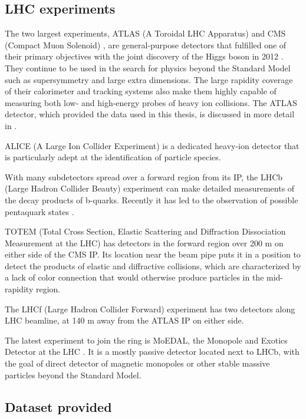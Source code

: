 \subsection{LHC experiments}
The two largest \lhc experiments, ATLAS (A Toroidal LHC Apparatus) \cite{Aad:2008zzm} and CMS (Compact Muon Solenoid) \cite{Chatrchyan:2008aa}, are general-purpose detectors that fulfilled one of their primary objectives with the joint discovery of the Higgs boson in 2012 \cite{Aad:2012tfa,Chatrchyan:2012xdj}.
They continue to be used in the search for physics beyond the Standard Model such as supersymmetry and large extra dimensions.
The large rapidity coverage of their calorimeter and tracking systems also make them highly capable of measuring both low- and high-energy probes of heavy ion collisions.
The ATLAS detector, which provided the data used in this thesis, is discussed in more detail in .

ALICE (A Large Ion Collider Experiment) \cite{Aamodt:2008zz} is a dedicated heavy-ion detector that is particularly adept at the identification of particle species.

With many subdetectors spread over a forward region from its IP, the LHCb (Large Hadron Collider Beauty) experiment \cite{Alves:2008zz} can make detailed measurements of the decay products of b-quarks. Recently it has led to the observation of possible pentaquark states \cite{Aaij:2015tga}.

TOTEM (Total Cross Section, Elastic Scattering and Diffraction Dissociation Measurement at the LHC) \cite{Anelli:2008zza} has detectors in the forward region over 200 m on either side of the CMS IP.
Its location near the beam pipe puts it in a position to detect the products of elastic and diffractive collisions, which are characterized by a lack of color connection that would otherwise produce particles in the mid-rapidity region.

The LHCf (Large Hadron Collider Forward) experiment \cite{Adriani:2008zz} has two detectors along LHC beamline, at 140 m away from the ATLAS IP on either side.

The latest experiment to join the ring is MoEDAL, the Monopole and Exotics Detector at the LHC \cite{Acharya:2014nyr}.
It is a mostly passive detector located next to LHCb, with the goal of direct detector of magnetic monopoles or other stable massive particles beyond the Standard Model.

\subsection{Dataset provided}

